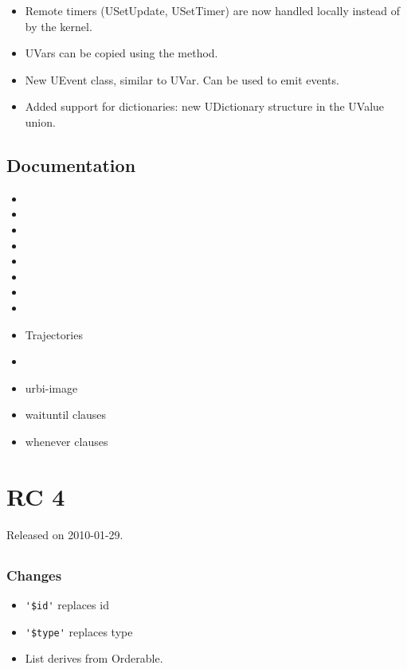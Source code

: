 \begin{itemize}
\item Remote timers (USetUpdate, USetTimer) are now handled locally
  instead of by the kernel.
\item UVars can be copied using the  method.
\item New UEvent class, similar to UVar. Can be used to emit events.
\item Added support for dictionaries: new UDictionary structure in the
  UValue union.
\end{itemize}

\subsection{Documentation}

\begin{itemize}
\item {}
\item {}
\item {}
\item {}
\item {}
\item {}
\item {}
\item {}
\item Trajectories
\item {}
\item urbi-image
\item waituntil clauses
\item whenever clauses
\end{itemize}

\section{ RC 4}
Released on 2010-01-29.

\subsection{\us}
\subsubsection{Changes}

\begin{itemize}
\item \lstinline|'$id'| replaces id
\item \lstinline|'$type'| replaces type
\item List derives from Orderable.
\end{itemize}

